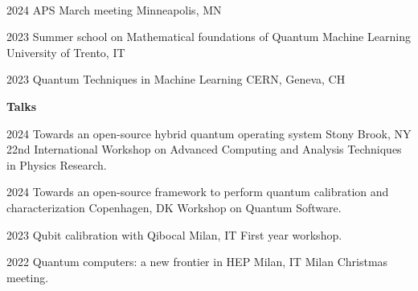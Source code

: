 \documentclass[9pt]{developercv} %
\begin{document}

\begin{refsection}[journals]
    \nocite{*}
    \printbibliography[heading=journals]
\end{refsection}

\begin{refsection}[preprints]
    \nocite{*}
    \printbibliography[heading=preprints]
\end{refsection}

\begin{refsection}[proceedings]
    \nocite{*}
    \printbibliography[heading=proceedings]
\end{refsection}


\\

\begin{entrylist}

    \entry
        {2024}
        {\small{APS March meeting}}
        {Minneapolis, MN}
        {}
        {}

    \entry
        {2023}
        {\small{Summer school on Mathematical foundations of Quantum Machine Learning}}
        {University of Trento, IT}
        {}
        {}
         
    \entry
        {2023}
        {\small{Quantum Techniques in Machine Learning}}
        {CERN, Geneva, CH}
        {}
        {}



\end{entrylist}
\textbf{Talks}\\
\begin{entrylist}
    \entry
        {2024}
        {\small{Towards an open-source hybrid quantum operating system}}
        {Stony Brook, NY}
        {\small{22nd International Workshop on Advanced Computing and Analysis Techniques in Physics Research.}}
        {}

    \entry
        {2024}
        {\small{Towards an open-source framework to perform quantum calibration and characterization}}
        {Copenhagen, DK}
        {\small{Workshop on Quantum Software.}}
        {}

    \entry
        {2023}
        {\small{Qubit calibration with Qibocal}}
        {Milan, IT}
        {\small{First year workshop.}}
        {}

    \entry
        {2022}
        {\small{Quantum computers: a new frontier in HEP}}
        {Milan, IT}
        {\small{Milan Christmas meeting.}}
        {}
\end{entrylist}
\end{document}
